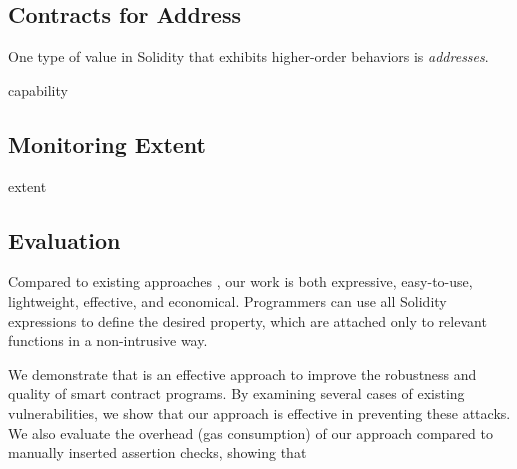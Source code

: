 \subsection*{\textbf{Contracts for Address}}

One type of value in Solidity that exhibits higher-order behaviors is \emph{addresses}.

capability


\subsection*{\textbf{Monitoring Extent}}

extent



\subsection*{\textbf{Evaluation}}

Compared to existing approaches , our work is both expressive,
easy-to-use, lightweight, effective, and economical.
Programmers can use all Solidity expressions to define the desired property,
which are attached only to relevant functions in a non-intrusive way.

We demonstrate that \lang is an effective approach to improve the robustness
and quality of smart contract programs.
By examining several cases of existing vulnerabilities, we show that our
approach is effective in preventing these attacks.
We also evaluate the overhead (gas consumption) of our approach compared to
manually inserted assertion checks, showing that 





